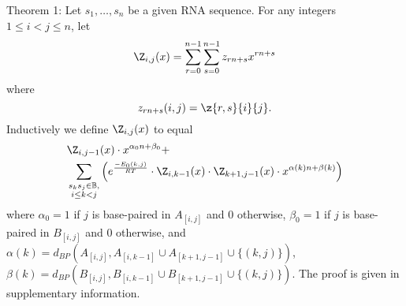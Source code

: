 \noindent
{\sc Theorem 1:} Let $s_1,\ldots,s_n$ be a given RNA sequence.
For any integers $1 \leq i < j \leq n$, let
\begin{eqnarray*}
\Z_{i,j}(x) = \sum_{r=0}^{n-1} \sum_{s=0}^{n-1} z_{rn+s}  x^{rn+s}
\end{eqnarray*}
where
\[
z_{rn+s}(i,j)= \z{r,s}{i}{j}.
\]
Inductively we define $\Z_{i,j}(x)$ to equal
\begin{eqnarray}
\label{eqn:polynomialRecursionNussJac}
&\Z_{i,j-1}(x) \cdot x^{\alpha_0n+\beta_0} + \\
&\sum_{\substack{s_k s_j \in \mathbb{B},\\i\le k<j}}
\left(e^{\frac{-E_0(k,j)}{RT}}\cdot
\Z_{i,k-1}(x)\cdot\Z_{k+1,j-1}(x)\cdot x^{\alpha(k)n+\beta(k)} \right)
\nonumber
\end{eqnarray}
where $\alpha_0 = 1$ if $j$ is base-paired in $A_{[i,j]}$ and $0$ otherwise,
$\beta_0 = 1$ if $j$ is base-paired in $B_{[i,j]}$ and $0$ otherwise, and
$\alpha(k)=d_{BP}(A_{[i,j]}, A_{[i,k-1]} \cup A_{[k+1,j-1]} \cup\{(k,j)\})$,
$\beta(k)=d_{BP}(B_{[i,j]}, B_{[i,k-1]} \cup B_{[k+1,j-1]} \cup\{(k,j)\})$.
The proof is given in supplementary information.
\medskip

